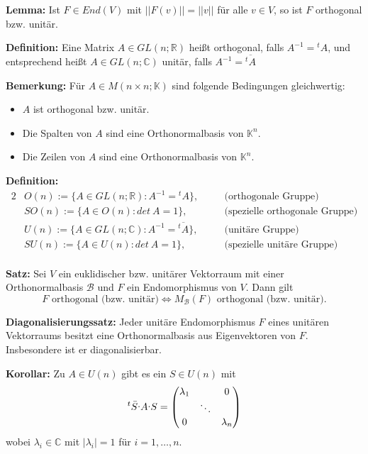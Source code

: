 \documentclass{article}
\let\oldcdot\cdot
\renewcommand{\cdot}{\raisebox{0.1ex}{$\oldcdot$}}
\begin{document}
\textbf{Lemma:} Ist $F\in End(V)$ mit $||F(v)||=||v||$ für alle $v\in V$, so
ist $F$ orthogonal bzw. unitär.

\textbf{Definition:} Eine Matrix $A\in GL(n;\mathbb{R})$ heißt orthogonal, falls
$A^{-1}={^tA}$, und entsprechend heißt $A\in GL(n;\mathbb{C})$ unitär, falls
$A^{-1}=\overline{^tA}$

\newpage
\textbf{Bemerkung:} Für $A\in M(n\times n;\mathbb{K})$ sind folgende
Bedingungen gleichwertig:
\begin{itemize}
\item[i)] $A$ ist orthogonal bzw. unitär.
\item[ii)] Die Spalten von $A$ sind eine Orthonormalbasis von $\mathbb{K}^n$.
\item[iii)] Die Zeilen von $A$ sind eine Orthonormalbasis von $\mathbb{K}^n$.
\end{itemize}

\textbf{Definition:}
\begin{alignat*}{2}
	&O(n):=\{A\in GL(n;\mathbb{R}):A^{-1}={^tA}\},\quad && \text{(orthogonale
	Gruppe)}\\
	&SO(n):=\{A\in O(n):det\ A=1\},\quad && \text{(spezielle orthogonale
	Gruppe)}\\
	&U(n):=\{A\in GL(n;\mathbb{C}):A^{-1}=\overline{^tA}\},\quad &&
	\text{(unitäre Gruppe)}\\
	&SU(n):=\{A\in U(n):det\ A=1\},\quad && \text{(spezielle unitäre
	Gruppe)}\\
\end{alignat*}

\textbf{Satz:} Sei $V$ ein euklidischer bzw. unitärer Vektorraum mit einer
Orthonormalbasis $\mathcal{B}$ und $F$ ein Endomorphismus von $V$. Dann gilt
\begin{equation*}
	F\text{ orthogonal (bzw. unitär)}\iff M_\mathcal{B}(F)\text{ orthogonal
	(bzw. unitär).}
\end{equation*}

\textbf{Diagonalisierungssatz:} Jeder unitäre Endomorphismus $F$ eines unitären
Vektorraums besitzt eine Orthonormalbasis aus Eigenvektoren von $F$.
Insbesondere ist er diagonalisierbar.

\textbf{Korollar:} Zu $A\in U(n)$ gibt es ein $S\in U(n)$ mit
\begin{equation*}
	{^t\bar S}\cdot A\cdot S=
	\begin{pmatrix}
		\lambda_1 & & 0\\
		& \ddots &\\
		0 & & \lambda_n
	\end{pmatrix}
\end{equation*}
wobei $\lambda_i\in\mathbb{C}$ mit $|\lambda_i|=1$ für $i=1,\dots,n$.
\end{document}
